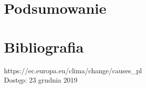 \documentclass[a4paper,12pt, twoside]{article}
\begin{document}
	
	
	\section{Podsumowanie}
	
	\newpage
	\section{Bibliografia}
	
	\begingroup
	\renewcommand{\section}[2]{}%
	\begin{thebibliography}{}
		
		https://ec.europa.eu/clima/change/causes\_pl\\
		Dostęp: 23 grudnia 2019
		
		
	\end{thebibliography}
	\endgroup
	
	\newpage
	\section{Spis rysunków}
	\begingroup
	\renewcommand{\section}[2]{}%
	\listoffigures
	\endgroup
	
\end{document}
